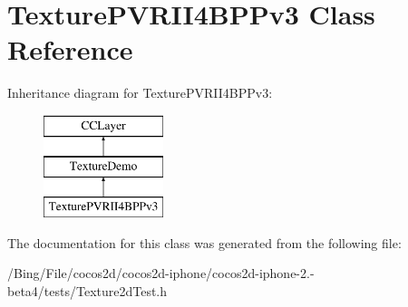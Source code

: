 \hypertarget{interface_texture_p_v_r_i_i4_b_p_pv3}{\section{Texture\-P\-V\-R\-I\-I4\-B\-P\-Pv3 Class Reference}
\label{interface_texture_p_v_r_i_i4_b_p_pv3}
}
Inheritance diagram for Texture\-P\-V\-R\-I\-I4\-B\-P\-Pv3\-:\begin{figure}[H]
\begin{center}
\leavevmode
\includegraphics[height=3.000000cm]{interface_texture_p_v_r_i_i4_b_p_pv3}
\end{center}
\end{figure}


The documentation for this class was generated from the following file\-:\begin{DoxyCompactItemize}
\item 
/\-Bing/\-File/cocos2d/cocos2d-\/iphone/cocos2d-\/iphone-\/2.-\/beta4/tests/Texture2d\-Test.\-h\end{DoxyCompactItemize}
